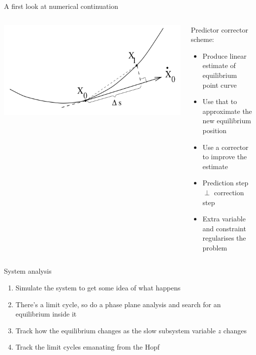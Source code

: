 \documentclass[presentation]{beamer}
\begin{document}
\begin{frame}[label={sec:org4fb7586}]{A first look at numerical continuation}
\begin{columns}
\begin{column}{0.5\columnwidth}
\begin{center}
\includegraphics[width=\textwidth]{./pac.png}
\end{center}
\end{column}

\begin{column}{0.5\columnwidth}
Predictor corrector scheme:
\begin{itemize}
\item Produce linear estimate of equilibrium point curve
\item Use that to approximate the new equilibrium position
\item Use a corrector to improve the estimate
\item Prediction step \(\perp\) correction step
\item Extra variable and constraint regularises the problem
\end{itemize}
\end{column}
\end{columns}
\end{frame}

\begin{frame}[label={sec:org1e89d6c}]{System analysis}
\begin{enumerate}
\item Simulate the system to get some idea of what happens
\item There's a limit cycle, so do a phase plane analysis and search for an equilibrium inside it
\item Track how the equilibrium changes as the slow subsystem variable \(z\) changes
\item Track the limit cycles emanating from the Hopf
\end{enumerate}
\end{frame}
\end{document}
